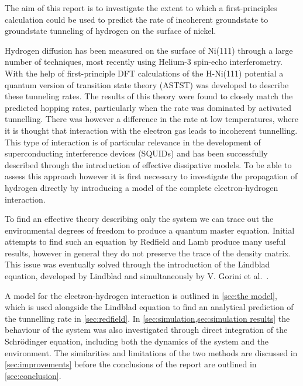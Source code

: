

The aim of this report is to
investigate the extent to which
a first-principles calculation
could be used to predict the rate of
incoherent groundstate to
groundstate tunneling of hydrogen
on the surface of nickel.

Hydrogen diffusion has been measured
on the surface of Ni(111) %
through a large number of
techniques\cite{LIN199141, Ni_Diffusion_Experement},
most recently
using Helium-3 spin-echo
interferometry\cite{Helium_spin_echo}.
With the help of first-principle DFT calculations of
the H-Ni(111) potential a %
quantum version of transition state theory (ASTST)
was developed to describe these tunneling rates\cite{Jianding-Zhu}.
The results of this theory
were found to closely
match the predicted
hopping rates, particularly
when the rate was dominated
by activated tunnelling\cite{Jianding-Zhu}.
There was however a difference
in the rate at low temperatures,
where it is thought that interaction with the
electron gas leads to incoherent tunnelling.
This type of interaction
is of particular relevance in
the development of superconducting interference devices
(SQUIDs)\cite{QubitIncoherentSaito2004}
and has been successfully described
through the introduction
of effective dissipative models\cite{CALDEIRA1983374}.
To be able to assess this approach
however it is first necessary to
investigate the propagation of hydrogen directly
by introducing a model of the
complete electron-hydrogen
interaction.

To find an effective
theory describing only the system
we can trace out the
environmental degrees of
freedom to produce a quantum master
equation. Initial
attempts to find such an
equation by Redfield\cite{REDFIELD19651}
and Lamb\cite{PhysRev.134.A1429} produce
many useful results, however in
general they do not preserve the
trace of the density matrix\cite{Chru_ci_ski_2017}. This
issue was eventually solved through
the introduction of the
Lindblad equation, developed
by Lindblad\cite{Lindblad1976}
and simultaneously
by V. Gorini et al.~\cite{doi:10.1063/1.522979}.



A model for the electron-hydrogen
interaction is outlined in
\cref{sec:the model},
which is used
alongside the
Lindblad equation
to find an analytical prediction
of the tunnelling rate
in \cref{sec:redfield}.
In
\cref{sec:simulation,sec:simulation results}
the behaviour of the
system was also
investigated
through direct integration
of the
Schrödinger equation,
including both the dynamics
of the system and the environment.
The similarities and
limitations of the two
methods are discussed
in \cref{sec:improvements}
before the conclusions of
the report are
outlined in \cref{sec:conclusion}.




